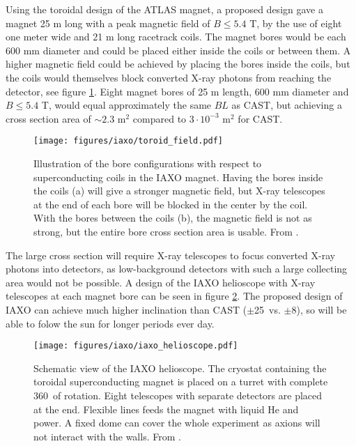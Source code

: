 Using the toroidal design of the ATLAS magnet, a proposed design gave a magnet 25 m long with a peak magnetic field of $B \leq 5.4$ T, by the use of eight one meter wide and 21 m long racetrack coils. The magnet bores would be each 600 mm diameter and could be placed either inside the coils or between them. A higher magnetic field could be achieved by placing the bores inside the coils, but the coils would themselves block converted X-ray photons from reaching the detector, see figure \ref{fig:toroid_field}. Eight magnet bores of 25 m length, 600 mm diameter and $B \leq 5.4$ T, would equal approximately the same $BL$ as CAST, but achieving a cross section area of $\sim2.3$ m$^2$ compared to $3\cdot10^{-3}$ m$^2$ for CAST.

\begin{figure}[!h]
  \center
\texttt{[image: figures/iaxo/toroid\_field.pdf]}
\caption{\footnotesize Illustration of the bore configurations with respect to superconducting coils in the IAXO magnet. Having the bores inside the coils (a) will give a stronger magnetic field, but X-ray telescopes at the end of each bore will be blocked in the center by the coil. With the bores between the coils (b), the magnetic field is not as strong, but the entire bore cross section area is usable. From \cite{Irastorza:2013uu}.}\label{fig:toroid_field}
\end{figure}

The large cross section will require X-ray telescopes to focus converted X-ray photons into detectors, as low-background detectors with such a large collecting area would not be possible. A design of the IAXO helioscope\cite{Vogel:2013we,Shilon:1501687,Irastorza:2012tt} with X-ray telescopes at each magnet bore can be seen in figure \ref{fig:iaxo_helioscope}. The proposed design of IAXO can achieve much higher inclination than CAST ($\pm$25\degr\ vs. $\pm$8\degr), so will be able to folow the sun for longer periods ever day.

\begin{figure}[!h]
  \center
\texttt{[image: figures/iaxo/iaxo\_helioscope.pdf]}
\caption{\footnotesize Schematic view of the IAXO helioscope. The cryostat containing the toroidal superconducting magnet is placed on a turret with complete 360\degr\ of rotation. Eight telescopes with separate detectors are placed at the end. Flexible lines feeds the magnet with liquid He and power. A fixed dome can cover the whole experiment as axions will not interact with the walls. From \cite{Armengaud:2014eo}.}\label{fig:iaxo_helioscope}
\end{figure}

